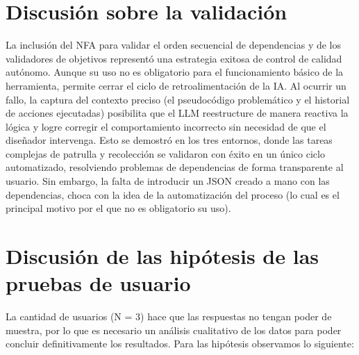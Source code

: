 \section{Discusión sobre la validación }
La inclusión del NFA para validar el orden secuencial de dependencias y de los validadores de objetivos representó una estrategia exitosa de control de calidad autónomo.
Aunque su uso no es obligatorio para el funcionamiento básico de la herramienta, permite cerrar el ciclo de retroalimentación de la IA.
Al ocurrir un fallo, la captura del contexto preciso (el pseudocódigo problemático y el historial de acciones ejecutadas) posibilita que el LLM reestructure de manera reactiva la lógica y logre corregir el comportamiento incorrecto sin necesidad de que el diseñador intervenga.
Esto se demostró en los tres entornos, donde las tareas complejas de patrulla y recolección se validaron con éxito en un único ciclo automatizado, resolviendo problemas de dependencias de forma transparente al usuario.
Sin embargo, la falta de introducir un JSON creado a mano con las dependencias, choca con la idea de la automatización del proceso (lo cual es el principal motivo por el que no es obligatorio su uso).

\section{Discusión de las hipótesis de las pruebas de usuario}
La cantidad de usuarios (N = 3) hace que las respuestas no tengan poder de muestra, por lo que es necesario un análisis cualitativo de los datos para poder concluir definitivamente los resultados.
Para las hipótesis observamos lo siguiente:

